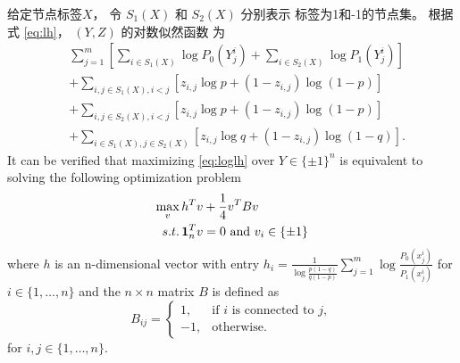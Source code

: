 给定节点标签$X$，
令 $S_1(X)$ 和 $S_2(X)$ 分别表示 标签为1和-1的节点集。
根据 式 \eqref{eq:lh}，
 $(Y,Z)$ 的对数似然函数 为
\begin{align}\label{eq:loglh}
    &\sum^m_{j=1}[\sum_{i\in S_1(X)} \log P_0(Y^i_{j})+\sum_{i\in S_2(X)} \log P_1(Y^i_{j})]\nonumber\\
    &+\sum_{i,j\in S_1(X),i<j}[z_{i,j}\log p+(1-z_{i,j})\log (1-p)]\nonumber\\
    &+\sum_{i,j\in S_2(X),i<j}[z_{i,j}\log p+(1-z_{i,j})\log (1-p)]
    \nonumber\\
    &+\sum_{i\in S_1(X),j\in S_2(X)}[z_{i,j}\log q+(1-z_{i,j})\log (1-q)].
\end{align}
It can be verified that maximizing \eqref{eq:loglh} over $Y\in\{\pm 1\}^n$ is equivalent to solving the following optimization problem
\begin{align}
    \max_{v}\, & h^T v + \frac{1}{4}v^T B v \notag \\
    s.t.\, & \mathbf{1}_n^T v = 0 \text{ and } v_i \in \{\pm 1 \} \label{eq:matrix_mle}
\end{align}
where $h$ is an n-dimensional vector with entry $h_i = \frac{1}{\log \frac{p(1-q)}{q(1-p)}}\sum_{j=1}^m \log \frac{P_0(x^i_{j})}{P_1(x^i_{j})}$ for $i\in\{1,\ldots,n\}$ and the $n\times n $ matrix $B$ is defined as
\begin{equation}
    B_{ij} = \begin{cases}
        1, & \text{if $i$ is connected to $j$}, \\
        -1,& \text{otherwise.}
    \end{cases}
\end{equation}  
for $i,j\in\{1,\ldots,n\}$.